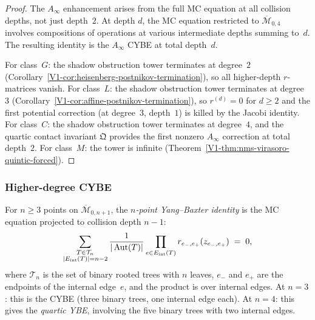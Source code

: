\begin{proof}
The $A_\infty$ enhancement arises from the full MC equation at all
collision depths, not just depth~$2$. At depth $d$, the MC equation
restricted to $\overline{\mathcal{M}}_{0,4}$ involves compositions
of operations at various intermediate depths summing to~$d$. The
resulting identity is the $A_\infty$ CYBE at total depth~$d$.

For class~$G$: the shadow obstruction tower terminates at degree~$2$
(Corollary~\ref{V1-cor:heisenberg-postnikov-termination}), so all
higher-depth $r$-matrices vanish.
For class~$L$: the shadow obstruction tower terminates at degree~$3$
(Corollary~\ref{V1-cor:affine-postnikov-termination}), so $r^{(d)} = 0$
for $d \geq 2$ and the first potential correction (at degree~$3$,
depth~$1$) is killed by the Jacobi identity.
For class~$C$: the shadow obstruction tower terminates at degree~$4$, and the
quartic contact invariant $\mathfrak{Q}$ provides the first nonzero
$A_\infty$ correction at total depth~$2$.
For class~$M$: the tower is infinite
(Theorem~\ref{V1-thm:nms-virasoro-quintic-forced}).
\end{proof}


\subsubsection{Higher-degree CYBE}

\begin{definition}
For $n \geq 3$ points on $\overline{\mathcal{M}}_{0,n+1}$, the
\emph{$n$-point Yang--Baxter identity} is the MC equation projected
to collision depth $n - 1$:
\begin{equation}%
\sum_{\substack{T \in \mathcal{T}_n \\
 |E_{\mathrm{int}}(T)| = n-2}}
\frac{1}{|\Aut(T)|}
\prod_{e \in E_{\mathrm{int}}(T)}
r_{e_-,e_+}(z_{e_-,e_+})
\;=\; 0,
\end{equation}
where $\mathcal{T}_n$ is the set of binary rooted trees with $n$
leaves, $e_-$ and $e_+$ are the endpoints of the internal edge~$e$,
and the product is over internal edges.
At $n = 3$: this is the CYBE (three binary trees, one internal edge
each).
At $n = 4$: this gives the \emph{quartic YBE}, involving the
five binary trees with two internal edges.
\end{definition}

